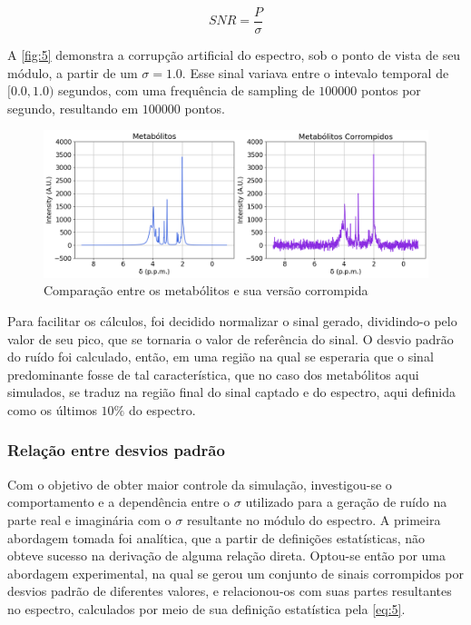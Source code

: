 \documentclass[
12pt,		
twoside, 
a4paper,
chapter=TITLE,
english,			
brazil]{USPSC-classe/USPSC}
\begin{document}
\begin{equation} \label{eq:2}
    SNR = \frac{P}{\sigma}
\end{equation}

A \autoref{fig:5} demonstra a corrupção artificial do espectro, sob o ponto de vista de seu módulo, a partir de um $\sigma = 1.0$. Esse sinal variava 
entre o intevalo temporal de $[0.0, 1.0)$ segundos, com uma frequência de sampling de $100000$ pontos por segundo, resultando em $100000$ pontos.

\begin{figure} [H]
    \includegraphics[scale=0.37]{metabolitos-corrompidos.png}
    \centering
    \caption{Comparação entre os metabólitos e sua versão corrompida}
    \label{fig:5}
\end{figure}

Para facilitar os cálculos, foi decidido normalizar o sinal gerado, dividindo-o pelo valor de seu pico, que se tornaria o valor de referência do sinal. O desvio padrão do ruído foi 
calculado, então, em uma região na qual se esperaria que o sinal predominante fosse de tal característica, que no caso dos metabólitos aqui simulados, se traduz na região final do sinal captado e do espectro, 
aqui definida como os últimos $10\%$ do espectro. 

\subsubsection{Relação entre desvios padrão}

Com o objetivo de obter maior controle da simulação, investigou-se o comportamento e a dependência entre o $\sigma$ utilizado para a geração de ruído na parte real e imaginária com o $\sigma$ resultante no módulo do espectro. A primeira abordagem 
tomada foi analítica, que a partir de definições estatísticas, não obteve sucesso na derivação de alguma relação direta. Optou-se então por uma abordagem experimental, na qual se gerou um conjunto de sinais 
corrompidos por desvios padrão de diferentes valores, e relacionou-os com suas partes resultantes no espectro, calculados por meio de sua definição 
estatística pela \autoref{eq:5}.
\end{document}
